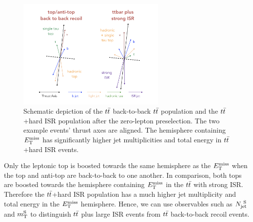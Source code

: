 \begin{figure}[h!]
  \centering
	\includegraphics[width=0.65\textwidth]{./figures/strategy/ttbar_2pop.png}
	\caption[Schematic depiction of the $\ttbar$ two tops back-to-back population and the $\ttbar$+hard ISR population after the zero-lepton preselection.]{Schematic depiction of the $\ttbar$ back-to-back $\ttbar$ population and the $\ttbar$+hard ISR population after the zero-lepton preselection. The two example events' thrust axes are aligned.  The hemisphere containing $E_{\mathrm{T}}^{\mathrm{miss}}$ has significantly higher jet multiplicities and total energy in $\ttbar$+hard ISR events. }
\label{fig:ttbar:2pop}
\end{figure}

\indent Only the leptonic top is boosted towards the same hemisphere as the $E_{\mathrm{T}}^{\mathrm{miss}}$ when the top and anti-top are back-to-back to one another.  In comparison, both tops are boosted towards the hemisphere containing $E_{\mathrm{T}}^{\mathrm{miss}}$ in the $\ttbar$ with strong ISR. Therefore the $\ttbar$+hard ISR population has a much higher jet multiplicity and total energy in the $E_{\mathrm{T}}^{\mathrm{miss}}$ hemisphere.  Hence, we can use observables such as $N_{\mathrm{jet}}^{~\mathrm{S}}$ and $m_{\mathrm{T}}^{\mathrm{S}}$ to distinguish $\ttbar$ plus large ISR events from $\ttbar$ back-to-back recoil events.   \\



